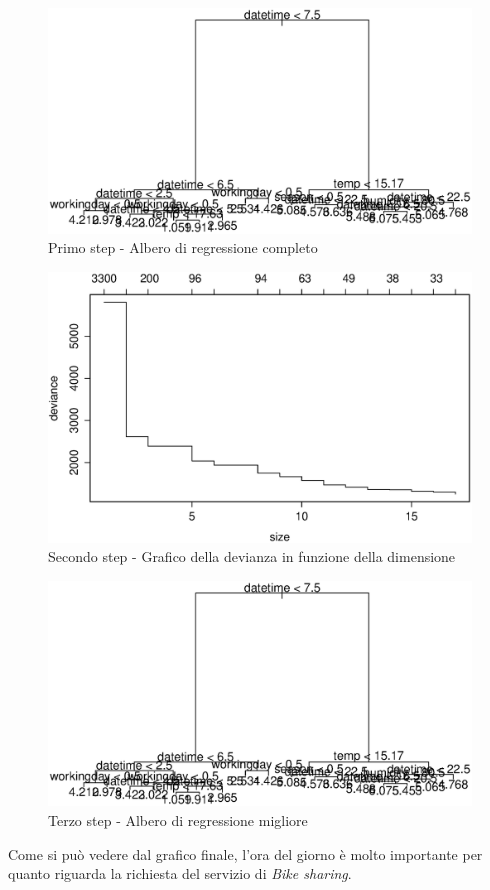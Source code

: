 \begin{figure}[H]
  \centering
  \includegraphics[width=.7\columnwidth]{images/non-linear/tree-1.eps}
  \caption{Primo step - Albero di regressione completo}
  \label{fig:tree-1}
\end{figure}

\begin{figure}[H]
  \centering
  \includegraphics[width=.7\columnwidth]{images/non-linear/tree-2.eps}
  \caption{Secondo step - Grafico della devianza in funzione della dimensione}
  \label{fig:tree-2}
\end{figure}

\begin{figure}[H]
  \centering
  \includegraphics[width=.7\columnwidth]{images/non-linear/tree-3.eps}
  \caption{Terzo step - Albero di regressione migliore}
  \label{fig:tree-3}
\end{figure}

Come si può vedere dal grafico finale, l'ora del giorno è molto importante per
quanto riguarda la richiesta del servizio di \emph{Bike sharing}.

